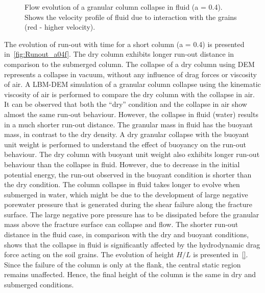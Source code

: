 \begin{figure}
\caption{Flow evolution of a granular column collapse in fluid (a = 0.4). Shows 
the velocity profile of fluid due to interaction with the grains (red - higher 
velocity).}
\label{fig:a04_snapshots}
\end{figure}


The evolution of run-out with time for a short column (a = 0.4) is presented 
in~\cref{fig:Runout_a04f}. The dry column exhibits longer run-out distance in 
comparison to the submerged column. The collapse of a dry column using DEM 
represents a collapse in vacuum, without any influence of drag forces or 
viscosity of air. A LBM-DEM simulation of a granular column collapse using the 
kinematic viscosity of air is performed to compare the dry column with the 
collapse in air. It can be observed that both the ``dry'' condition and the 
collapse in air show almost the same run-out behaviour. However, the collapse 
in fluid (water) results in a much shorter run-out distance. The granular mass 
in fluid has the buoyant mass, in contrast to the dry density. A dry granular 
collapse with the buoyant unit weight is performed to understand the effect of 
buoyancy on the run-out behaviour. The dry column with buoyant unit weight also 
exhibits longer run-out behaviour than the collapse in fluid. However, due to 
decrease in the initial potential energy, the run-out observed in the buoyant 
condition is shorter than the dry condition. The column collapse in fluid takes 
longer to evolve when submerged in water, which might be due to the development 
of large negative porewater pressure that is generated during the shear failure 
along the fracture surface. The large negative pore pressure has to be 
dissipated before the granular mass above the fracture surface can collapse and 
flow. The shorter run-out distance in the fluid case, in comparison with the 
dry and buoyant conditions, shows that the collapse in fluid is significantly 
affected by the hydrodynamic drag force acting on the soil grains. The 
evolution of height $H/L$ is presented in~\cref{}. Since the failure of the 
column is only at the flank, the central static region remains unaffected. 
Hence, the final height of the column is the same in dry and submerged 
conditions.


